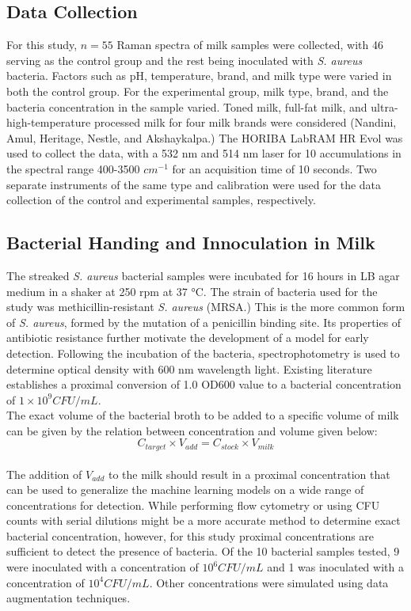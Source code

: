 \subsection{Data Collection}
For this study, $n=55$ Raman spectra of milk samples were collected, with 46 serving as the control group and the rest being inoculated with \textit{S. aureus} bacteria. Factors such as pH, temperature, brand, and milk type were varied in both the control group. For the experimental group, milk type, brand, and the bacteria concentration in the sample varied. Toned milk, full-fat milk, and ultra-high-temperature processed milk for four milk brands were considered (Nandini, Amul, Heritage, Nestle, and Akshaykalpa.) The HORIBA LabRAM HR Evol was used to collect the data, with a 532 nm and 514 nm laser for 10 accumulations in the spectral range 400-3500 $cm^{-1}$ for an acquisition time of 10 seconds. Two separate instruments of the same type and calibration were used for the data collection of the control and experimental samples, respectively. 

\subsection{Bacterial Handing and Innoculation in Milk}

The streaked \textit{S. aureus} bacterial samples were incubated for 16 hours in LB agar medium in a shaker at 250 rpm at 37 °C. The strain of bacteria used for the study was methicillin-resistant \textit{S. aureus} (MRSA.) This is the more common form of \textit{S. aureus}, formed by the mutation of a penicillin binding site. \cite{Siddiqui2018_MRSA} Its properties of antibiotic resistance further motivate the development of a model for early detection. Following the incubation of the bacteria, spectrophotometry is used to determine optical density with 600 nm wavelength light. Existing literature establishes a proximal conversion of 1.0 OD600 value to a bacterial concentration of $1 \times 10^9 CFU/mL$. \cite{Yang2013_srep01863} \\

\noindent The exact volume of the bacterial broth to be added to a specific volume of milk can be given by the relation between concentration and volume given below: \\
$$
C_{target} \times V_{add} = C_{stock} \times V_{milk}
$$ \\

\noindent The addition of $V_{add}$ to the milk should result in a proximal concentration that can be used to generalize the machine learning models on a wide range of concentrations for detection. While performing flow cytometry or using CFU counts with serial dilutions might be a more accurate method to determine exact bacterial concentration, however, for this study proximal concentrations are sufficient to detect the presence of bacteria. Of the 10 bacterial samples tested, 9 were inoculated with a concentration of $10^6 CFU/mL$ and 1 was inoculated with a concentration of $10^4 CFU/mL$. Other concentrations were simulated using data augmentation techniques. 

